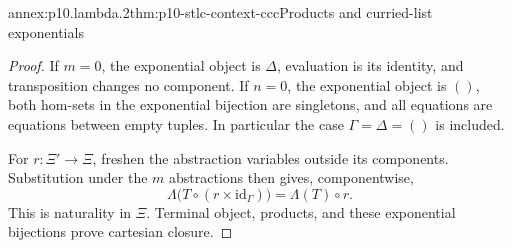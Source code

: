 \begin{annexitem}{annex:p10.lambda.2}{thm:p10-stlc-context-ccc}{Products and curried-list exponentials}
\begin{proof}
If \(m=0\), the exponential object is \(\Delta\), evaluation
is its identity, and transposition changes no component.
If \(n=0\), the exponential object is \(()\), both hom-sets
in the exponential bijection are singletons, and all equations
are equations between empty tuples.  In particular the case
\(\Gamma=\Delta=()\) is included.

For \(r:\Xi'\to\Xi\), freshen the abstraction variables
outside its components.  Substitution under the \(m\)
abstractions then gives, componentwise,
\[
 \Lambda\bigl(T\circ(r\times\mathrm{id}_\Gamma)\bigr)
                  =\Lambda(T)\circ r.
\]
This is naturality in \(\Xi\).  Terminal object, products,
and these exponential bijections prove cartesian closure.
\end{proof}
\end{annexitem}


